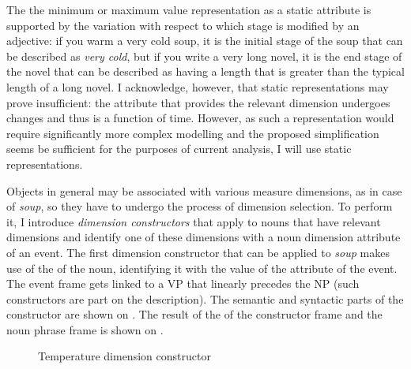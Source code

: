The  the minimum or maximum value representation as a static attribute is supported by the variation with respect to which stage is modified by an adjective: if you warm a very cold soup, it is the initial stage of the soup that can be described as \textit{very cold}, but if you write a very long novel, it is the end stage of the novel that can be described as having a length that is greater than the typical length of a long novel. I acknowledge, however, that static representations may prove insufficient: the attribute that provides the relevant dimension undergoes changes and thus is a function of time. However, as such a representation would require significantly more complex modelling and the proposed simplification seems be sufficient for the purposes of current analysis, I will use static representations.

Objects in general may be associated with various measure dimensions, as in case of \textit{soup}, so they have to undergo the process of dimension selection. To perform it, I introduce \textit{dimension constructors} that apply to nouns that have relevant dimensions and identify one of these dimensions with a noun dimension attribute of an event. The first dimension constructor that can be applied to \textit{soup} makes use of the  of the noun, identifying it with the value of the attribute \NOUNDIM of the event. The event frame gets linked to a VP that linearly precedes the NP (such constructors are part on the  description). The semantic and syntactic parts of the constructor are shown on . The result of the  of the  constructor frame and the noun phrase frame is shown on .

\begin{figure}
\begin{minipage}{0.6\textwidth}
\end{minipage}
\begin{minipage}{0.35\textwidth}
\end{minipage}
\caption{Temperature dimension constructor\label{constructor:temp}}
\end{figure}


